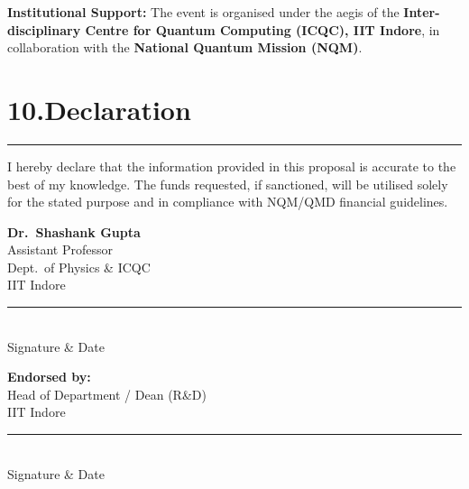 \documentclass[12pt,a4paper]{article}
\begin{document}
\vspace{8pt}
\noindent\textbf{Institutional Support:} The event is organised under the aegis of the \textbf{Inter-disciplinary Centre for Quantum Computing (ICQC), IIT Indore}, in collaboration with the \textbf{National Quantum Mission (NQM)}.

\section*{10.\quad Declaration}
\vspace{-4pt}\hrule\vspace{6pt}

I hereby declare that the information provided in this proposal is accurate to the best of my knowledge. The funds requested, if sanctioned, will be utilised solely for the stated purpose and in compliance with NQM/QMD financial guidelines.

\vspace{2cm}

\begin{minipage}{0.45\textwidth}
  \textbf{Dr.\ Shashank Gupta}\\
  Assistant Professor\\
  Dept.\ of Physics \& ICQC\\
  IIT Indore\\
  \vspace{1.5cm}
  \rule{6cm}{0.5pt}\\
  {\small Signature \& Date}
\end{minipage}
\hfill
\begin{minipage}{0.45\textwidth}
  \textbf{Endorsed by:}\\
  Head of Department / Dean (R\&D)\\
  IIT Indore\\
  \vspace{1.5cm}
  \rule{6cm}{0.5pt}\\
  {\small Signature \& Date}
\end{minipage}
\end{document}
